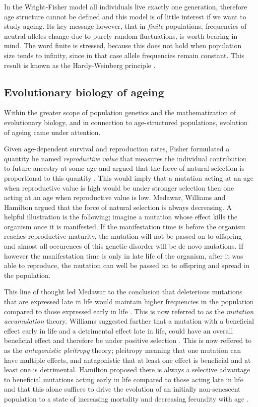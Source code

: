 \documentclass[11pt, a4paper]{article}
\theoremstyle{definition}
\begin{document}
    In the Wright-Fisher model all individuals live exactly one generation, therefore age structure cannot be defined and this model is of little interest if we want to study ageing. Its key message however, that in \emph{finite} populations, frequencies of neutral alleles change due to purely random fluctuations, is worth bearing in mind.
    The word finite is stressed, because this does not hold when population size tends to infinity, since in that case allele frequencies remain constant. This result is known as the Hardy-Weinberg principle \autocite{hardy1908, weinberg1908}.

\subsection{Evolutionary biology of ageing}
    Within the greater scope of population genetics and the mathematization of evolutionary biology, and in connection to age-structured populations, evolution of ageing came under attention. 
    
    Given age-dependent survival and reproduction rates, Fisher formulated a quantity he named \emph{reproductive value} that measures the individual contribution to future ancestry at some age and argued that the force of natural selection is proportional to this quantity \autocite{fisher1930genetical}. This would imply that a mutation acting at an age when reproductive value is high would be under stronger selection then one acting at an age when reproductive value is low. Medawar, Williams and Hamilton argued that the force of natural selection is always decreasing. A helpful illustration is the following; imagine a mutation whose effect kills the organism once it is manifested. If the manifestation time is before the organism reaches reproductive maturity, the mutation will not be passed on to offspring and almost all occurences of this genetic disorder will be de novo mutations. If however the manifestation time is only in late life of the organism, after it was able to reproduce, the mutation can
    well be passed on to offspring and spread in the population.
    
    This line of thought led Medawar to the conclusion that deleterious mutations that are expressed late in life would maintain higher frequencies in the population compared to those expressed early in life \autocite{medawar1957unsolved}. This is now referred to as the \emph{mutation accumulation} theory. Williams suggested further that a mutation with a beneficial effect early in life and a detrimental effect late in life, could have an overall beneficial effect and therefore be under positive selection \autocite{williams1957pleiotropy}. This is now reffered to as the \emph{antagonistic pleitropy} theory; pleitropy meaning that one mutation can have multiple effects, and antagonistic that at least one effect is beneficial and at least one is detrimental. Hamilton proposed there is always a selective advantage to beneficial mutations acting early in life compared to those acting late in life and that this alone suffices to drive the evolution of an initially non-senescent
    population to a state of increasing mortality and decreasing fecundity with age \autocite{hamilton1966moulding}.
\end{document}
